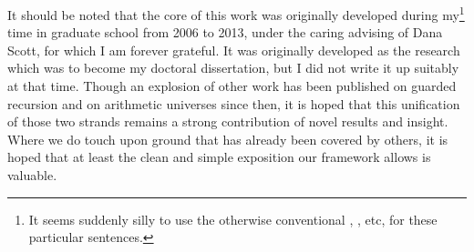 It should be noted that the core of this work was originally developed during my\footnote{It seems suddenly silly to use the otherwise conventional , , etc, for these particular sentences.} time in graduate school from 2006 to 2013, under the caring advising of Dana Scott, for which I am forever grateful. It was originally developed as the research which was to become my doctoral dissertation, but I did not write it up suitably at that time. Though an explosion of other work has been published on guarded recursion and on arithmetic universes since then, it is hoped that this unification of those two strands remains a strong contribution of novel results and insight. Where we do touch upon ground that has already been covered by others, it is hoped that at least the clean and simple exposition our framework allows is valuable.

\fileend